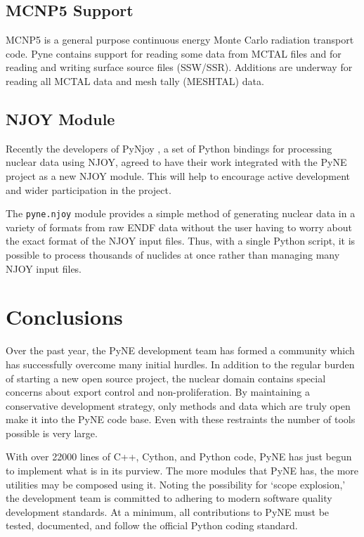 \documentclass{anstrans}
\begin{document}
\subsection{MCNP5 Support}
MCNP5 \cite{mcnp} is a general purpose continuous energy Monte Carlo radiation
transport code.  Pyne contains support for reading some data from MCTAL files
and for reading and writing surface source files (SSW/SSR).  Additions are
underway for reading all MCTAL data and mesh tally (MESHTAL) data.

\subsection{NJOY Module}
Recently the developers of PyNjoy \cite{dragon}, a set of Python bindings for
processing nuclear data using NJOY, agreed to have their work integrated with
the PyNE project as a new NJOY module. This will help to encourage active
development and wider participation in the project.

The \texttt{pyne.njoy} module provides a simple method of generating nuclear
data in a variety of formats from raw ENDF data without the user having to worry
about the exact format of the NJOY input files. Thus, with a single Python
script, it is possible to process thousands of nuclides at once rather than
managing many NJOY input files.


\section{Conclusions}
Over the past year, the PyNE development team has formed a community which has
successfully overcome many initial hurdles.  In addition to the regular burden
of starting a new open source project, the nuclear domain contains special
concerns about export control and non-proliferation.  By maintaining a
conservative development strategy, only methods and data which are truly open
make it into the PyNE code base.  Even with these restraints the number of tools
possible is very large.

With over 22000 lines of C++, Cython, and Python code, PyNE has just begun to
implement what is in its purview.  The more modules that PyNE has, the more
utilities may be composed using it.  Noting the possibility for `scope
explosion,' the development team is committed to adhering to modern software
quality development standards.  At a minimum, all contributions to PyNE must be
tested, documented, and follow the official Python coding standard.
\end{document}
